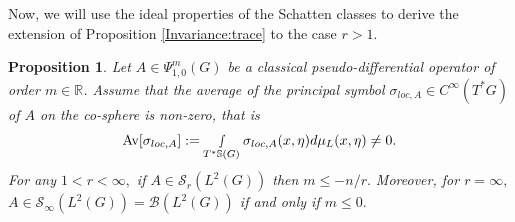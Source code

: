 \documentclass[12pt, reqno]{amsart}
\newtheorem{proposition}[theorem]{Proposition}
\theoremstyle{definition}
\theoremstyle{remark}
\numberwithin{equation}{section}
\begin{document}
Now, we will use the ideal properties of the Schatten classes to derive the extension of Proposition \ref{Invariance:trace} to the case $r>1.$ 
\begin{proposition}\label{Invariance:trace:2} Let $A\in \Psi^{m}_{1,0}(G)$ be a classical pseudo-differential operator of order $m\in \mathbb{R}$. Assume that the average of the principal symbol $\sigma_{loc,A}\in C^\infty(T^*G)$ of $A$ on the co-sphere is non-zero, that is
\begin{equation}\label{Average:symbol:22}
    \textnormal{Av}[\sigma_{loc,A}]:=\smallint\limits_{ T^{*}\mathbb{S}(G)}\sigma_{loc,A}(x,\eta)d\mu_{L}(x,\eta)\neq 0.
\end{equation}
For any $1<r< \infty,$ if $A\in \mathscr{S}_r(L^2(G))$ then $m\leq -n/r.$ Moreover, for $r=\infty,$     $A\in \mathscr{S}_\infty(L^2(G))=\mathscr{B}(L^2(G))$ if and only if $m\leq 0.$
\end{proposition}
\end{document}
